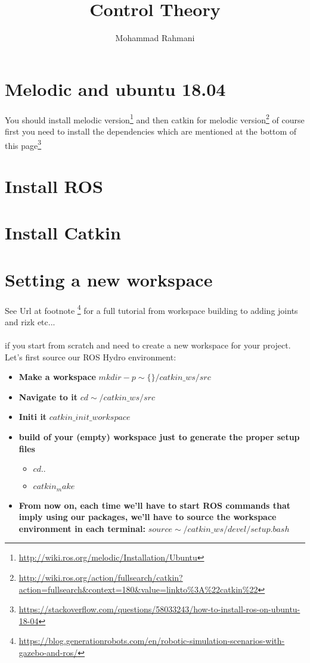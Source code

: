 \documentclass{article}
\begin{document}
	
	\title{Control Theory}
	\author{Mohammad Rahmani}
	\date{}
	\maketitle
		\section{Melodic and ubuntu 18.04}
			You should install melodic version\footnote{\url{http://wiki.ros.org/melodic/Installation/Ubuntu}} and then catkin for melodic version\footnote{\url{http://wiki.ros.org/action/fullsearch/catkin?action=fullsearch\&context=180\&value=linkto\%3A\%22catkin\%22}} of course first you need to install the dependencies which are mentioned at the bottom of this page\footnote{\url{https://stackoverflow.com/questions/58033243/how-to-install-ros-on-ubuntu-18-04}}
		\section{Install ROS}
		\section{Install Catkin}
		\section{Setting a new workspace}
		See Url at footnote \footnote{\url{https://blog.generationrobots.com/en/robotic-simulation-scenarios-with-gazebo-and-ros/}} for a full tutorial from workspace building to adding joints and rizk etc...
		\paragraph{}
		if you start from scratch and need to create a new workspace for your project. Let’s first source our ROS Hydro environment:
		\begin{itemize}
			\item \textbf{Make a workspace} $mkdir -p \sim\{\}/catkin\_ws/src$
			\item \textbf{Navigate to it} $cd \sim/catkin\_ws/src$
			\item \textbf{Initi it} $catkin\_init\_workspace$
			\item \textbf{build of your (empty) workspace just to generate the proper setup files} 
				\begin{itemize}
					\item $cd ..$ 
					\item $catkin_make$
				\end{itemize}
			\item \textbf{From now on, each time we’ll have to start ROS commands that imply using our packages, we’ll have to source the workspace environment in each terminal:} $source \sim/catkin\_ws/devel/setup.bash$
		\end{itemize}
	
\end{document}
